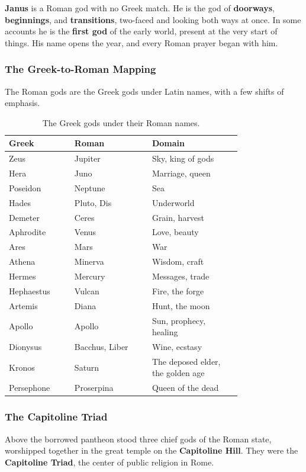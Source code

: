 \textbf{Janus} is a Roman god with no Greek match. He is the god of
\textbf{doorways}, \textbf{beginnings}, and \textbf{transitions}, two-faced and
looking both ways at once. In some accounts he is the \textbf{first god} of the
early world, present at the very start of things. His name opens the year, and
every Roman prayer began with him.

\subsubsection{The Greek-to-Roman Mapping}

The Roman gods are the Greek gods under Latin names, with a few shifts of
emphasis.

\begin{longtable}{L{0.22\linewidth} L{0.26\linewidth} L{0.30\linewidth}}
\caption{The Greek gods under their Roman names.}\\
\toprule
\textbf{Greek} & \textbf{Roman} & \textbf{Domain} \\
\midrule
Zeus & Jupiter & Sky, king of gods \\
Hera & Juno & Marriage, queen \\
Poseidon & Neptune & Sea \\
Hades & Pluto, Dis & Underworld \\
Demeter & Ceres & Grain, harvest \\
Aphrodite & Venus & Love, beauty \\
Ares & Mars & War \\
Athena & Minerva & Wisdom, craft \\
Hermes & Mercury & Messages, trade \\
Hephaestus & Vulcan & Fire, the forge \\
Artemis & Diana & Hunt, the moon \\
Apollo & Apollo & Sun, prophecy, healing \\
Dionysus & Bacchus, Liber & Wine, ecstasy \\
Kronos & Saturn & The deposed elder, the golden age \\
Persephone & Proserpina & Queen of the dead \\
\bottomrule
\end{longtable}

\subsubsection{The Capitoline Triad}

Above the borrowed pantheon stood three chief gods of the Roman state, worshipped
together in the great temple on the \textbf{Capitoline Hill}. They were the
\textbf{Capitoline Triad}, the center of public religion in Rome.

